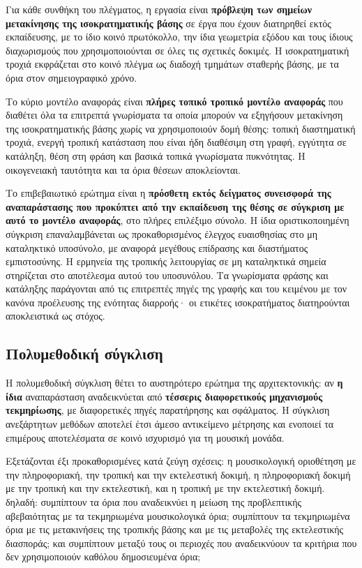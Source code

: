 \documentclass[11pt,a4paper]{article}
\begin{document}
Για κάθε συνθήκη του πλέγματος, η εργασία είναι \textbf{πρόβλεψη των σημείων μετακίνησης της ισοκρατηματικής βάσης} σε έργα που έχουν διατηρηθεί εκτός εκπαίδευσης, με το ίδιο κοινό πρωτόκολλο, την ίδια γεωμετρία εξόδου και τους ίδιους διαχωρισμούς που χρησιμοποιούνται σε όλες τις σχετικές δοκιμές. Η ισοκρατηματική τροχιά εκφράζεται στο κοινό πλέγμα ως διαδοχή τμημάτων σταθερής βάσης, με τα όρια στον σημειογραφικό χρόνο.

Το κύριο μοντέλο αναφοράς είναι \textbf{πλήρες τοπικό τροπικό μοντέλο αναφοράς} που διαθέτει όλα τα επιτρεπτά γνωρίσματα τα οποία μπορούν να εξηγήσουν μετακίνηση της ισοκρατηματικής βάσης χωρίς να χρησιμοποιούν δομή θέσης: τοπική διαστηματική τροχιά, ενεργή τροπική κατάσταση που είναι ήδη διαθέσιμη στη γραφή, εγγύτητα σε κατάληξη, θέση στη φράση και βασικά τοπικά γνωρίσματα πυκνότητας. Η οικογενειακή ταυτότητα και τα όρια θέσεων αποκλείονται.

Το επιβεβαιωτικό ερώτημα είναι η \textbf{πρόσθετη εκτός δείγματος συνεισφορά της αναπαράστασης που προκύπτει από την εκπαίδευση της θέσης σε σύγκριση με αυτό το μοντέλο αναφοράς}, στο πλήρες επιλέξιμο σύνολο. Η ίδια οριστικοποιημένη σύγκριση επαναλαμβάνεται ως προκαθορισμένος έλεγχος ευαισθησίας στο μη καταληκτικό υποσύνολο, με αναφορά μεγέθους επίδρασης και διαστήματος εμπιστοσύνης. Η ερμηνεία της τροπικής λειτουργίας σε μη καταληκτικά σημεία στηρίζεται στο αποτέλεσμα αυτού του υποσυνόλου. Τα γνωρίσματα φράσης και κατάληξης παράγονται από τις επιτρεπτές πηγές της γραφής και του κειμένου με τον κανόνα προέλευσης της ενότητας διαρροής· οι ετικέτες ισοκρατήματος διατηρούνται αποκλειστικά ως στόχος.

\subsection{Πολυμεθοδική σύγκλιση}\label{app:stats-convergence}

Η πολυμεθοδική σύγκλιση θέτει το αυστηρότερο ερώτημα της αρχιτεκτονικής: αν \textbf{η ίδια} αναπαράσταση αναδεικνύεται από \textbf{τέσσερις διαφορετικούς μηχανισμούς τεκμηρίωσης}, με διαφορετικές πηγές παρατήρησης και σφάλματος. Η σύγκλιση ανεξάρτητων μεθόδων αποτελεί έτσι άμεσο αντικείμενο μέτρησης και ενοποιεί τα επιμέρους αποτελέσματα σε κοινό ισχυρισμό για τη μουσική μονάδα.

Εξετάζονται έξι προκαθορισμένες κατά ζεύγη σχέσεις: η μουσικολογική οριοθέτηση με την πληροφοριακή, την τροπική και την εκτελεστική δοκιμή, η πληροφοριακή δοκιμή με την τροπική και την εκτελεστική, και η τροπική με την εκτελεστική δοκιμή.
δηλαδή: συμπίπτουν τα όρια που αναδεικνύει η μείωση της προβλεπτικής αβεβαιότητας με τα τεκμηριωμένα μουσικολογικά όρια; συμπίπτουν τα τεκμηριωμένα όρια με τις μετακινήσεις της τροπικής βάσης και με τις μεταβολές της εκτελεστικής διασποράς; και συμπίπτουν μεταξύ τους οι περιοχές που αναδεικνύουν τα κριτήρια που δεν χρησιμοποιούν καθόλου δημοσιευμένα όρια;
\end{document}
